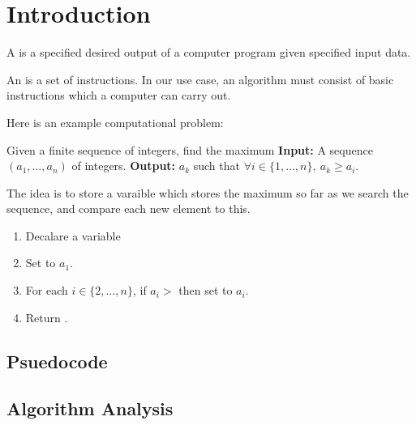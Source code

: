\documentclass[11pt]{report}
\begin{document}
\section{Introduction}
\begin{defi}
    A  is a specified desired output of a computer program given specified input data.
\end{defi}
\begin{defi}[Algorithm]
    An  is a set of instructions. In our use case, an algorithm must consist of basic instructions which a computer can carry out.
\end{defi}
Here is an example computational problem:
\begin{nproblem} Given a finite sequence of integers, find the maximum
    \mypar
    \textbf{Input: }A sequence $(a_1,\dots,a_n)$ of integers.
    \mypar \textbf{Output: }$a_k$ such that $\forall i \in \{1,\dots,n\}, \ a_k \geq a_i$.
\end{nproblem}
\begin{algEng} The idea is to store a varaible which stores the maximum so far as we search the sequence, and compare each new element to this.
    \begin{enumerate}
        \item Decalare a variable 
        \item Set  to $a_1$.
        \item For each $i \in \{2,\dots,n\}$, if $a_i > $  then set  to $a_i$.
        \item Return .
    \end{enumerate}
\end{algEng}
\subsection{Psuedocode}

\subsection{Algorithm Analysis}
\pagebreak
\end{document}
